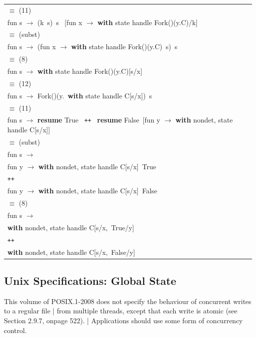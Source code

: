 \documentclass[logo,bsc,singlespacing,parskip]{infthesis}
\begin{document}
\begin{longtable}{@{}l@{}}
\quad$\equiv$ (11) \\
fun s $\rightarrow$ (k\ s)\ s \ [fun x $\rightarrow$ \textbf{with } state handle Fork()(y.C)/k] \\
\quad$\equiv$ (subst) \\
fun s $\rightarrow$ (fun x $\rightarrow$ \textbf{with } state handle Fork()(y.C)\ s)\ s \\
\quad$\equiv$ (8) \\
fun s $\rightarrow$ \textbf{with } state handle Fork()(y.C)[s/x] \\
\quad$\equiv$ (12) \\
fun s $\rightarrow$ Fork()(y.\ \textbf{with } state handle C[s/x])\ s \\
\quad$\equiv$ (11) \\
fun s $\rightarrow$ \textbf{resume } True \texttt{ ++ } \textbf{resume } False\ [fun y $\rightarrow$ \textbf{with } nondet, state handle C[s/x]] \\
\quad$\equiv$ (subst) \\
fun s $\rightarrow$ \\
\quad\quad fun y $\rightarrow$ \textbf{with } nondet, state handle C[s/x]\ True \\
\quad\quad\texttt{++} \\
\quad\quad fun y $\rightarrow$ \textbf{with } nondet, state handle C[s/x]\ False \\
\quad$\equiv$ (8) \\
fun s $\rightarrow$ \\
\quad\quad \textbf{with } nondet, state handle C[s/x,\ True/y] \\
\quad\quad\texttt{++} \\
\quad\quad \textbf{with } nondet, state handle C[s/x,\ False/y] \\
\end{longtable}






\subsection{Unix Specifications: Global State }

\begin{tcolorbox}[colback=gray!10, colframe=gray!60, sharp corners, boxrule=0.5pt, title={POSIX Base Specifications, Issue 7, p.2316}]
 This volume of POSIX.1-2008 does not specify the behaviour of concurrent writes to a regular file |
 from multiple threads, except that each write is atomic (see Section 2.9.7, onpage 522). |
 Applications should use some form of concurrency control.
\end{tcolorbox}
\end{document}
